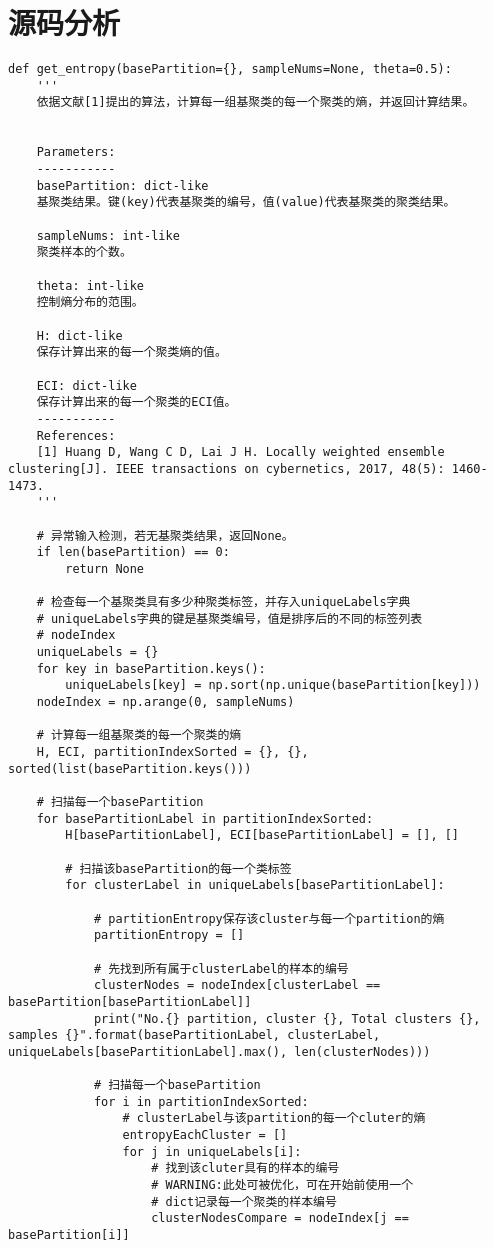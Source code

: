 \documentclass[UTF8, 12pt]{ctexart}
\begin{document}
\section{源码分析}
\begin{lstlisting}
def get_entropy(basePartition={}, sampleNums=None, theta=0.5):
	'''
	依据文献[1]提出的算法，计算每一组基聚类的每一个聚类的熵，并返回计算结果。
	
	
	Parameters:
	-----------
	basePartition: dict-like
	基聚类结果。键(key)代表基聚类的编号，值(value)代表基聚类的聚类结果。
	
	sampleNums: int-like
	聚类样本的个数。
	
	theta: int-like
	控制熵分布的范围。
	
	H: dict-like
	保存计算出来的每一个聚类熵的值。
	
	ECI: dict-like
	保存计算出来的每一个聚类的ECI值。
	-----------
	References:
	[1] Huang D, Wang C D, Lai J H. Locally weighted ensemble clustering[J]. IEEE transactions on cybernetics, 2017, 48(5): 1460-1473.
	'''

	# 异常输入检测，若无基聚类结果，返回None。
	if len(basePartition) == 0:
		return None

	# 检查每一个基聚类具有多少种聚类标签，并存入uniqueLabels字典
	# uniqueLabels字典的键是基聚类编号，值是排序后的不同的标签列表
	# nodeIndex
	uniqueLabels = {}
	for key in basePartition.keys():
		uniqueLabels[key] = np.sort(np.unique(basePartition[key]))
	nodeIndex = np.arange(0, sampleNums)

	# 计算每一组基聚类的每一个聚类的熵
	H, ECI, partitionIndexSorted = {}, {}, sorted(list(basePartition.keys()))
	
	# 扫描每一个basePartition
	for basePartitionLabel in partitionIndexSorted:
		H[basePartitionLabel], ECI[basePartitionLabel] = [], []

		# 扫描该basePartition的每一个类标签
		for clusterLabel in uniqueLabels[basePartitionLabel]:

			# partitionEntropy保存该cluster与每一个partition的熵
			partitionEntropy = []

			# 先找到所有属于clusterLabel的样本的编号
			clusterNodes = nodeIndex[clusterLabel == basePartition[basePartitionLabel]]
			print("No.{} partition, cluster {}, Total clusters {}, samples {}".format(basePartitionLabel, clusterLabel, uniqueLabels[basePartitionLabel].max(), len(clusterNodes)))

			# 扫描每一个basePartition
			for i in partitionIndexSorted:
				# clusterLabel与该partition的每一个cluter的熵
				entropyEachCluster = []
				for j in uniqueLabels[i]:
					# 找到该cluter具有的样本的编号
					# WARNING:此处可被优化，可在开始前使用一个
					# dict记录每一个聚类的样本编号
					clusterNodesCompare = nodeIndex[j == basePartition[i]]


\end{lstlisting}
\end{document}

